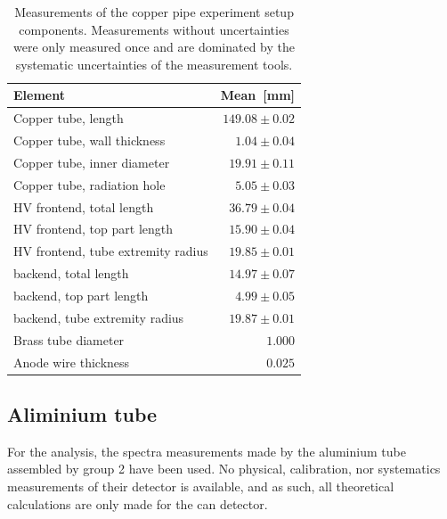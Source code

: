 \begin{table}[htb]
	\begin{tabularx}{\linewidth}{p{4.5cm}r}
		\textbf{Element} & \textbf{Mean}~{[}mm{]}          \\ \hline
		Copper tube, length                & $149.08 \pm 0.02$ \\
		Copper tube, wall thickness        & $1.04 \pm 0.04$   \\
		Copper tube, inner diameter        & $19.91 \pm 0.11$  \\
		Copper tube, radiation hole        & $5.05 \pm 0.03$   \\
		HV frontend, total length          & $36.79 \pm 0.04$  \\
		HV frontend, top part length       & $15.90 \pm 0.04$  \\
		HV frontend, tube extremity radius & $19.85 \pm 0.01$  \\
		backend, total length              & $14.97 \pm 0.07$  \\
		backend, top part length           & $4.99 \pm 0.05$   \\
		backend, tube extremity radius     & $19.87 \pm 0.01$  \\
		Brass tube diameter                & $1.000$           \\
		Anode wire thickness               & $0.025$           \\ \hline
	\end{tabularx}
\caption{Measurements of the copper pipe experiment setup components. Measurements without uncertainties were only measured once and are dominated by the systematic uncertainties of the measurement tools.}%
\label{Tab:coppercan_sizes}
\end{table}

\subsection{Aliminium tube}
For the analysis, the spectra measurements made by the aluminium tube assembled by group 2 have been used. No physical, calibration, nor systematics measurements of their detector is available, and as such, all theoretical calculations are only made for the can detector.